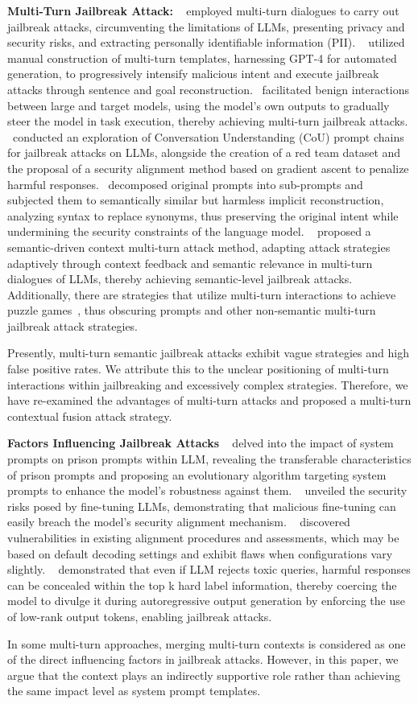 \textbf{Multi-Turn Jailbreak Attack:}
~\cite{li2023multi} employed multi-turn dialogues to carry out jailbreak attacks, circumventing the limitations of LLMs, presenting privacy and security risks, and extracting personally identifiable information (PII). ~\cite{zhou2024speak} utilized manual construction of multi-turn templates, harnessing GPT-4 for automated generation, to progressively intensify malicious intent and execute jailbreak attacks through sentence and goal reconstruction. ~\cite{russinovich2024great}facilitated benign interactions between large and target models, using the model’s own outputs to gradually steer the model in task execution, thereby achieving multi-turn jailbreak attacks. ~\cite{bhardwaj2023red}conducted an exploration of Conversation Understanding (CoU) prompt chains for jailbreak attacks on LLMs, alongside the creation of a red team dataset and the proposal of a security alignment method based on gradient ascent to penalize harmful responses. ~\cite{li2024drattack}decomposed original prompts into sub-prompts and subjected them to semantically similar but harmless implicit reconstruction, analyzing syntax to replace synonyms, thus preserving the original intent while undermining the security constraints of the language model. ~\cite{yang2024chain} proposed a semantic-driven context multi-turn attack method, adapting attack strategies adaptively through context feedback and semantic relevance in multi-turn dialogues of LLMs, thereby achieving semantic-level jailbreak attacks. Additionally, there are strategies that utilize multi-turn interactions to achieve puzzle games~\cite{DBLP:conf/uss/LiuZZDM024}, thus obscuring prompts and other non-semantic multi-turn jailbreak attack strategies.

Presently, multi-turn semantic jailbreak attacks exhibit vague strategies and high false positive rates. We attribute this to the unclear positioning of multi-turn interactions within jailbreaking and excessively complex strategies. Therefore, we have re-examined the advantages of multi-turn attacks and proposed a multi-turn contextual fusion attack strategy.


\textbf{Factors Influencing Jailbreak Attacks}
~\cite{Zou2024IsTS} delved into the impact of system prompts on prison prompts within LLM, revealing the transferable characteristics of prison prompts and proposing an evolutionary algorithm targeting system prompts to enhance the model’s robustness against them. ~\cite{qi2024finetuning} unveiled the security risks posed by fine-tuning LLMs, demonstrating that malicious fine-tuning can easily breach the model’s security alignment mechanism. ~\cite{huang2024catastrophic} discovered vulnerabilities in existing alignment procedures and assessments, which may be based on default decoding settings and exhibit flaws when configurations vary slightly.
~\cite{zhang2024large} demonstrated that even if LLM rejects toxic queries, harmful responses can be concealed within the top k hard label information, thereby coercing the model to divulge it during autoregressive output generation by enforcing the use of low-rank output tokens, enabling jailbreak attacks.

In some multi-turn approaches, merging multi-turn contexts is considered as one of the direct influencing factors in jailbreak attacks. However, in this paper, we argue that the context plays an indirectly supportive role rather than achieving the same impact level as system prompt templates.